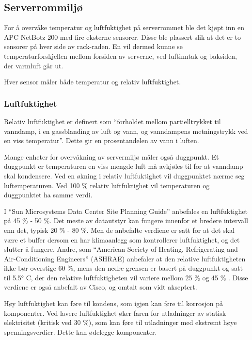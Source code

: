 \subsection{Serverrommiljø}
For å overvåke temperatur og luftfuktighet på serverrommet ble det kjøpt inn en APC NetBotz 200\cite{netbotz2} med fire eksterne sensorer. Disse ble plassert slik at det er to sensorer på hver side av rack-raden. En vil dermed kunne se temperaturforskjellen mellom forsiden av serverne, ved luftinntak og baksiden, der varmluft går ut.

Hver sensor måler både temperatur og relativ luftfuktighet.

\subsubsection{Luftfuktighet}
Relativ luftfuktighet er definert som ``forholdet mellom partielltrykket til vanndamp, i en gassblanding av luft og vann, og vanndampens metningstrykk ved en viss temperatur''. Dette gir en prosentandelen av vann i luften\cite{wiki:luftfuktighet}. 

Mange enheter for overvåkning av servermiljø måler også duggpunkt. Et duggpunkt er temperaturen en viss mengde luft må avkjøles til for at vanndamp skal kondensere. Ved en økning i relativ luftfuktighet vil duggpunktet nærme seg luftemperaturen. Ved 100 \% relativ luftfuktighet vil temperaturen og duggpunktet ha samme verdi. 

I ``Sun Microsystems Data Center Site Planning Guide'' anbefales en luftfuktighet på 45 \% - 50 \%. Det meste av datautstyr kan fungere innenfor et bredere intervall enn det, typisk 20 \% - 80 \%. Men de anbefalte verdiene er satt for at det skal være et buffer dersom en har klimaanlegg som kontrollerer luftfuktighet, og det slutter å fungere\cite{planningserver}. Andre, som ``American Society of Heating, Refrigerating and Air-Conditioning Engineers'' (ASHRAE) anbefaler at den relative luftfuktigheten ikke bør overstige 60 \%, mens den nedre grensen er basert på duggpunkt og satt til 5.5° C, der den relative luftfuktigheten vil variere mellom 25 \% og 45 \% \cite{envguide}. Disse verdiene er også anbefalt av Cisco\cite{envguidecisco}, og omtalt som vidt akseptert. 

Høy luftfuktighet kan føre til kondens, som igjen kan føre til korrosjon på komponenter. Ved lavere luftfuktighet øker faren for utladninger av statisk elektrisitet (kritisk ved 30 \%), som kan føre til utladninger med ekstremt høye spenningsverdier. Dette kan ødelegge komponenter.

